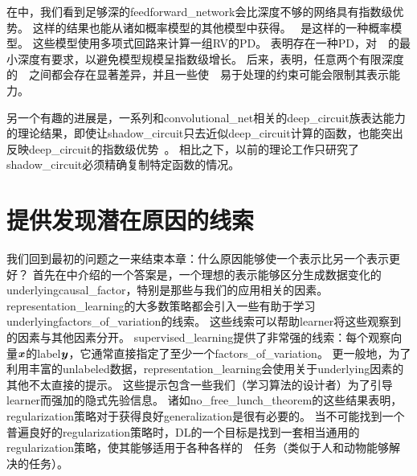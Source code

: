 
在中，我们看到足够深的\gls{feedforward_network}会比深度不够的网络具有指数级优势。
这样的结果也能从诸如概率模型的其他模型中获得。
~\citep{Poon+Domingos-2011}是这样的一种概率模型。
这些模型使用多项式回路来计算一组\gls{RV}的\gls{PD}。
\cite{Delalleau+Bengio-2011-small}表明存在一种\gls{PD}，对~~的最小深度有要求，以避免模型规模呈指数级增长。
后来，\cite{Martens+Medabalimi-arxiv2014}表明，任意两个有限深度的~~之间都会存在显著差异，并且一些使~~易于处理的约束可能会限制其表示能力。


另一个有趣的进展是，一系列和\gls{convolutional_net}相关的\gls{deep_circuit}族表达能力的理论结果，即使让\gls{shadow_circuit}只去近似\gls{deep_circuit}计算的函数，也能突出反映\gls{deep_circuit}的指数级优势~\citep{Cohen-et-al-arXiv2015}。
相比之下，以前的理论工作只研究了\gls{shadow_circuit}必须精确复制特定函数的情况。


\section{提供发现潜在原因的线索}
\label{sec:providing_clues_to_discover_underlying_causes}


我们回到最初的问题之一来结束本章：什么原因能够使一个表示比另一个表示更好？
首先在中介绍的一个答案是，一个理想的表示能够区分生成数据变化的\gls{underlying}\gls{causal_factor}，特别是那些与我们的应用相关的因素。
\gls{representation_learning}的大多数策略都会引入一些有助于学习\gls{underlying}\gls{factors_of_variation}的线索。
这些线索可以帮助\gls{learner}将这些观察到的因素与其他因素分开。
\gls{supervised_learning}提供了非常强的线索：每个观察向量$\boldsymbol{\mathit{x}}$的\gls{label}$\boldsymbol{\mathit{y}}$，它通常直接指定了至少一个\gls{factors_of_variation}。
更一般地，为了利用丰富的\gls{unlabeled}数据，\gls{representation_learning}会使用关于\gls{underlying}因素的其他不太直接的提示。
这些提示包含一些我们（学习算法的设计者）为了引导\gls{learner}而强加的隐式先验信息。
诸如\gls{no_free_lunch_theorem}的这些结果表明，\gls{regularization}策略对于获得良好\gls{generalization}是很有必要的。
当不可能找到一个普遍良好的\gls{regularization}策略时，\gls{DL}的一个目标是找到一套相当通用的\gls{regularization}策略，使其能够适用于各种各样的~~任务（类似于人和动物能够解决的任务）。

